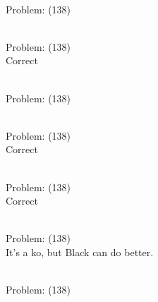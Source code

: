 \documentclass[11pt]{article}
\begin{document}
\begin{minipage}[t]{0.5\textwidth}
  {\centering
  
\\
Problem: (138)\\
  }
\end{minipage}
\begin{minipage}[t]{0.5\textwidth}
  {\centering
  
\\
Problem: (138)\\
Correct\\
  }
\end{minipage}
\begin{minipage}[t]{0.5\textwidth}
  {\centering
  
\\
Problem: (138)\\
  }
\end{minipage}
\begin{minipage}[t]{0.5\textwidth}
  {\centering
  
\\
Problem: (138)\\
Correct\\
  }
\end{minipage}
\begin{minipage}[t]{0.5\textwidth}
  {\centering
  
\\
Problem: (138)\\
Correct\\
  }
\end{minipage}
\begin{minipage}[t]{0.5\textwidth}
  {\centering
  
\\
Problem: (138)\\
It's a ko, but Black can do better.\\
  }
\end{minipage}
\begin{minipage}[t]{0.5\textwidth}
  {\centering
  
\\
Problem: (138)\\
  }
\end{minipage}
\end{document}

